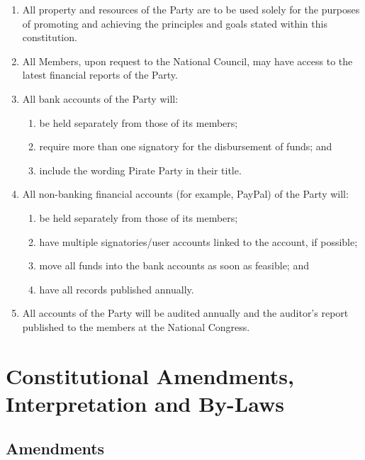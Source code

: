 \documentclass[a4paper,titlepage,8.5pt]{article}
\begin{document}
\begin{enumerate}
\item All property and resources of the Party are to be used solely for the purposes of promoting and achieving the principles and goals stated within this constitution.
\item All Members, upon request to the National Council, may have access to the latest financial reports of the Party.
\item All bank accounts of the Party will:
\begin{enumerate}
\item be held separately from those of its members;
\item require more than one signatory for the disbursement of funds; and
\item include the wording Pirate Party in their title.
\end{enumerate}
\item All non-banking financial accounts (for example, PayPal) of the Party will:
\begin{enumerate}
\item be held separately from those of its members;
\item have multiple signatories/user accounts linked to the account, if possible;
\item move all funds into the bank accounts as soon as feasible; and
\item have all records published annually.
\end{enumerate}
\item All accounts of the Party will be audited annually and the auditor’s report published to the members at the National Congress.
\end{enumerate}

\section{Constitutional Amendments, Interpretation and By-Laws}

\subsection{Amendments}
\end{document}
